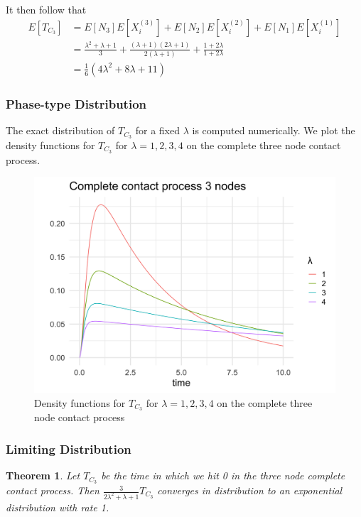 \documentclass{article}
\theoremstyle{plain}
\newtheorem{theorem}{Theorem}[section]
\theoremstyle{definition}
\theoremstyle{remark}
\numberwithin{equation}{section}
\begin{document}
It then follow that
\begin{align*}
        E[T_{C_3}] &= E[N_3] E[X_i^{(3)}] + E[N_2] E[X_i^{(2)}] + E[N_1] E[X_i^{(1)}]\\
        &= \frac{\lambda^2 + \lambda + 1}{3} + \frac{(\lambda + 1)(2 \lambda + 1)}{2 (\lambda + 1)} + \frac{1 + 2\lambda}{1 + 2 \lambda}\\
        &= \frac{1}{6}(4 \lambda^2 + 8 \lambda + 11)
\end{align*}

\subsubsection{Phase-type Distribution}

The exact distribution of $T_{C_3}$ for a fixed $\lambda$ is computed numerically.
We plot the density functions for $T_{C_3}$ for $\lambda = 1, 2, 3, 4$ on the complete three node contact process.

\begin{figure}[h]
  \centering
    \includegraphics[width=.80\textwidth]{figures/complete_3_contact_phase_densities.png}
   \caption{Density functions for $T_{C_3}$ for $\lambda = 1, 2, 3, 4$ on the complete three node contact process}
  \label{fig:contact_3_phase_densities}
\end{figure}

\subsubsection{Limiting Distribution}

\begin{theorem}
Let $T_{C_3}$ be the time in which we hit 0 in the three node complete contact process.
Then $\frac{3}{2 \lambda^2 + \lambda + 1} T_{C_3}$ converges in distribution to an exponential distribution with rate 1.
\end{theorem}
\end{document}
